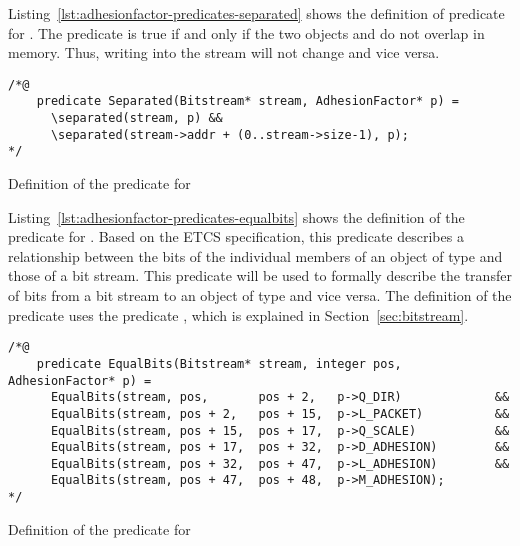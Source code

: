 \FloatBarrier

\label{sec:adhesionfactor-predicates-separated}

Listing~\ref{lst:adhesionfactor-predicates-separated} shows the definition of 
predicate   for .
The predicate  is true if and only if 
the two objects  and  do not overlap in memory.
Thus, writing into the stream will not change  and vice versa.

\begin{listing}[hbt]
\begin{minipage}{0.99\textwidth}
\begin{lstlisting}[style=acsl-block]
/*@
    predicate Separated(Bitstream* stream, AdhesionFactor* p) =
      \separated(stream, p) &&
      \separated(stream->addr + (0..stream->size-1), p);
*/
\end{lstlisting}
\end{minipage}
\caption{\label{lst:adhesionfactor-predicates-separated}Definition of the  predicate for }
\end{listing}

\FloatBarrier

\label{sec:adhesionfactor-predicates-equalbits}


Listing~\ref{lst:adhesionfactor-predicates-equalbits} shows the definition of the
 predicate for .
Based on the ETCS specification, this predicate describes a
relationship between the bits of the individual members
of an object of type  and those of a bit stream.
This predicate will be used to formally describe the transfer of bits
from a bit stream to an object of type  and vice versa.
The definition of the predicate  uses
the predicate , which is explained
in Section~\ref{sec:bitstream}.

\begin{listing}[hbt]
\begin{minipage}{0.99\textwidth}
\begin{lstlisting}[style=acsl-block]
/*@
    predicate EqualBits(Bitstream* stream, integer pos, AdhesionFactor* p) =
      EqualBits(stream, pos,       pos + 2,   p->Q_DIR)             &&
      EqualBits(stream, pos + 2,   pos + 15,  p->L_PACKET)          &&
      EqualBits(stream, pos + 15,  pos + 17,  p->Q_SCALE)           &&
      EqualBits(stream, pos + 17,  pos + 32,  p->D_ADHESION)        &&
      EqualBits(stream, pos + 32,  pos + 47,  p->L_ADHESION)        &&
      EqualBits(stream, pos + 47,  pos + 48,  p->M_ADHESION);
*/
\end{lstlisting}
\end{minipage}
\caption{\label{lst:adhesionfactor-predicates-equalbits}Definition of the  predicate for }
\end{listing}

